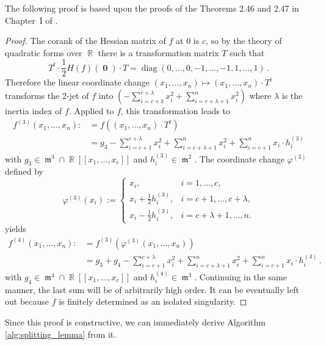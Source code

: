 \documentclass[noend]{amsproc}
\theoremstyle{definition}
\DeclareMathOperator{\m}{\mathfrak{m}}
\DeclareMathOperator{\diag}{diag}
\DeclareMathOperator{\R}{\mathbb{R}}
\DeclareMathOperator{\boldzero}{\mathbf{0}}
\begin{document}
The following proof is based upon the proofs of the Theorems 2.46 and 2.47 in
Chapter~I of \citet{GLS2007}.

\begin{proof}
The corank of the Hessian matrix of $f$ at $0$ is $c$, so by the theory of
quadratic forms over $\R$ there is a transformation matrix $T$ such that
\[
T^t \cdot {\textstyle\frac{1}{2}} H(f)(\boldzero) \cdot T
= \diag(0,\ldots,0,-1,\ldots,-1,1,\ldots,1) \,.
\]
Therefore the linear coordinate change
$(x_1,\ldots,x_n) \mapsto (x_1,\ldots,x_n) \cdot T^t$ transforms the 2-jet of
$f$ into
$\left(-\sum_{i=c+1}^{c+\lambda} x_i^2 +\sum_{i=c+\lambda+1}^n x_i^2\right)$
where $\lambda$ is the inertia index of $f$.
Applied to $f$, this transformation leads to
\begin{align*}
f^{(3)} (x_1,\ldots,x_n)
  :\!&= f((x_1,\ldots,x_n) \cdot T^t) \\
  &= g_3
  -\sum_{i=c+1}^{c+\lambda} x_i^2 +\sum_{i=c+\lambda+1}^n x_i^2
  +\sum_{i=c+1}^n x_i\cdot h_i^{(3)}
\end{align*}
with $g_3 \in \m^3 \cap \R[[x_1,\ldots,x_c]]$ and $h_i^{(3)} \in \m^2$. The
coordinate change $\varphi^{(3)}$ defined by
\[
\varphi^{(3)}(x_i) :=
\begin{cases}
x_i,                      &i = 1, \ldots, c, \\
x_i+\frac{1}{2}h_i^{(3)}, &i = c+1, \ldots, c+\lambda, \\
x_i-\frac{1}{2}h_i^{(3)}, &i = c+\lambda+1, \ldots, n.
\end{cases}
\]
yields
\begin{align*}
f^{(4)} (x_1,\ldots,x_n)
  :\!&= f^{(3)}(\varphi^{(3)}(x_1,\ldots,x_n)) \\
  &= g_3 +g_4
  -\sum_{i=c+1}^{c+\lambda} x_i^2 +\sum_{i=c+\lambda+1}^n x_i^2
  +\sum_{i=c+1}^n x_i\cdot h_i^{(4)} \,.
\end{align*}
with $g_4 \in \m^4 \cap \R[[x_1,\ldots,x_c]]$ and $h_i^{(4)} \in \m^3$.
Continuing in the same manner, the last sum will be of arbitrarily high order.
It can be eventually left out because $f$ is finitely determined as an isolated
singularity.
\end{proof}

Since this proof is constructive, we can immediately derive Algorithm
\ref{alg:splitting_lemma} from it.
\end{document}
